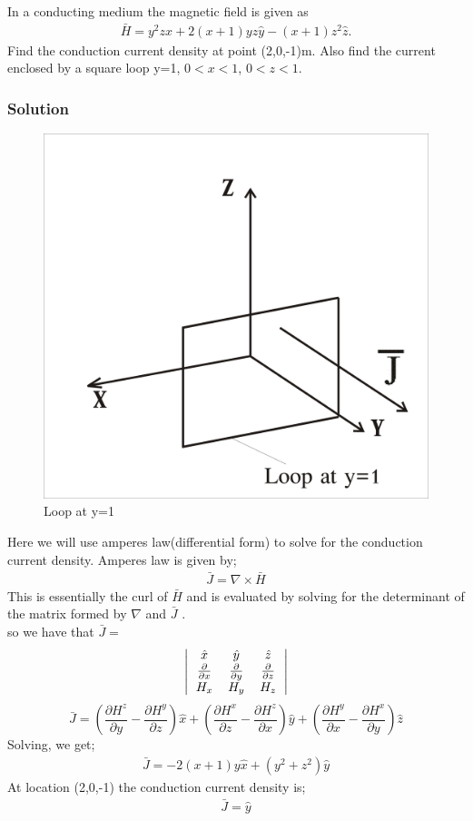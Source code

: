 \begin{example}
In a conducting medium the magnetic field is given as
\begin{align*}
\bar{H}=y^{2}z\hat{x}+2(x+1)yz\hat{y}-(x+1)z^{2}\hat{z}.
\end{align*}
Find the conduction current density at point (2,0,-1)m. Also find the current enclosed by a square loop y=1,  $0<x<1$, $0<z<1$.
\subsubsection*{Solution}
\begin{figure}[h]
\centering
\includegraphics[width=.5\linewidth]{./graphics/problem3b}
\caption{Loop at y=1}
\end{figure} 

Here we will use amperes law(differential form) to solve for the conduction current density. Amperes law is given by;
\begin{align*}
\bar{J}=\nabla\times\bar{H}
\end{align*}
This is essentially the curl of $\bar{H}$ and is evaluated by solving for the determinant of the matrix formed by $\nabla$ and $\bar{J}$ .\\
so we have that $\bar{J} =$
\[
\left|
\begin{tabular}{c c c}
$\hat{x}$ & $\hat{y}$ & $\hat{z}$\\
$\frac{\partial}{\partial x}$ &  $\frac{\partial}{\partial y}$ &  $\frac{\partial}{\partial z}$\\
$H_{x}$ & $H_{y}$ & $H_{z}$
\end{tabular}
\right|
\]
\begin{dmath*}
\bar{J}= (\frac{\partial H^{z}}{\partial y}-\frac{\partial H^{y}}{\partial z})\hat{x}+ (\frac{\partial H^{x}}{\partial z}-\frac{\partial H^{z}}{\partial x})\hat{y}+ (\frac{\partial H^{y}}{\partial x}-\frac{\partial H^{x}}{\partial y})\hat{z}
\end{dmath*}
Solving, we get;
\begin{align*}
\bar{J}=-2(x+1)y\hat{x}+(y^{2}+z^{2})\hat{y}
\end{align*}
At location (2,0,-1) the conduction current density is;
\begin{align*}
\bar{J}=\hat{y}
\end{align*}


\end{example}
